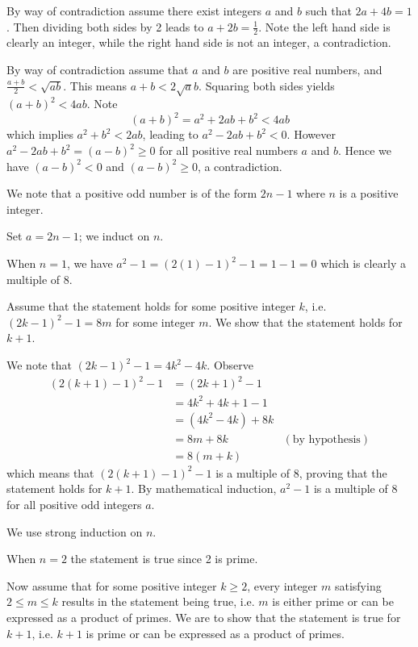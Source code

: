 \begin{questions}
    \item By way of contradiction assume there exist integers $a$ and $b$ such that $2a + 4b = 1$. Then dividing both sides by 2 leads to $a + 2b = \frac12$. Note the left hand side is clearly an integer, while the right hand side is not an integer, a contradiction.

    \item By way of contradiction assume that $a$ and $b$ are positive real numbers, and $\frac{a+b}{2} < \sqrt{ab}$. This means $a+b<2\sqrt ab$. Squaring both sides yields $(a+b)^2 < 4ab$. Note
    \[
        (a+b)^2 = a^2 + 2ab + b^2 < 4ab
    \]
    which implies $a^2 + b^2 < 2ab$, leading to $a^2 - 2ab + b^2 < 0$. However $a^2 - 2ab + b^2 = (a-b)^2 \geq 0$ for all positive real numbers $a$ and $b$. Hence we have $(a-b)^2 < 0$ and $(a-b)^2 \geq 0$, a contradiction.

    \item We note that a positive odd number is of the form $2n - 1$ where $n$ is a positive integer.

    Set $a = 2n - 1$; we induct on $n$.

    When $n = 1$, we have $a^2 - 1 = (2(1) - 1)^2 - 1 = 1 - 1 = 0$ which is clearly a multiple of 8.

    Assume that the statement holds for some positive integer $k$, i.e. $(2k-1)^2 - 1 = 8m$ for some integer $m$. We show that the statement holds for $k + 1$.

    We note that $(2k-1)^2 - 1 = 4k^2 - 4k$. Observe
    \begin{align*}
        (2(k+1)-1)^2 - 1 &= (2k+1)^2 - 1\\
        &= 4k^2 + 4k + 1 - 1\\
        &= (4k^2 - 4k) + 8k\\
        &= 8m + 8k & (\text{by hypothesis})\\
        &= 8(m+k)
    \end{align*}
    which means that $(2(k+1)-1)^2 - 1$ is a multiple of 8, proving that the statement holds for $k+1$. By mathematical induction, $a^2 - 1$ is a multiple of 8 for all positive odd integers $a$.

    \item We use strong induction on $n$.

    When $n = 2$ the statement is true since 2 is prime.

    Now assume that for some positive integer $k \geq 2$, every integer $m$ satisfying $2 \leq m \leq k$ results in the statement being true, i.e. $m$ is either prime or can be expressed as a product of primes. We are to show that the statement is true for $k + 1$, i.e. $k+1$ is prime or can be expressed as a product of primes.


\end{questions}
